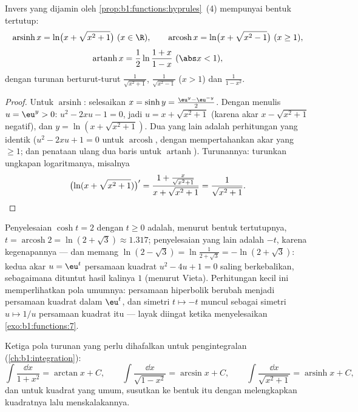 \begin{proposition}\label{prop:b1:functions:invhyp}
Invers yang dijamin oleh \cref{prop:b1:functions:hyprules}~(4) mempunyai
bentuk tertutup:
\[
\operatorname{arsinh} x = \ln\bigl(x + \sqrt{x^2 + 1}\bigr)
\ (x \in \R),
\qquad
\operatorname{arcosh} x = \ln\bigl(x + \sqrt{x^2 - 1}\bigr)
\ (x \geq 1),
\]
\[
\operatorname{artanh} x = \frac 12 \ln\frac{1 + x}{1 - x}
\ (\abs x < 1),
\]
dengan turunan berturut-turut $\frac{1}{\sqrt{x^2+1}}$, $\frac{1}{\sqrt{x^2-1}}$
($x > 1$) dan $\frac{1}{1 - x^2}$.
\end{proposition}

\begin{proof}
Untuk $\operatorname{arsinh}$: selesaikan $x = \sinh y = \frac{\eu^y -
\eu^{-y}}{2}$. Dengan menulis $u = \eu^y > 0$: $u^2 - 2xu - 1 = 0$, jadi $u = x
+ \sqrt{x^2 + 1}$ (karena akar $x - \sqrt{x^2+1}$ negatif), dan $y =
\ln(x + \sqrt{x^2+1})$. Dua yang lain adalah perhitungan yang identik
($u^2 - 2xu + 1 = 0$ untuk $\operatorname{arcosh}$, dengan mempertahankan akar
yang $\geq 1$; dan penataan ulang dua baris untuk $\operatorname{artanh}$).
Turunannya: turunkan ungkapan logaritmanya, misalnya
\[
\bigl(\ln(x + \sqrt{x^2+1})\bigr)'
= \frac{1 + \frac{x}{\sqrt{x^2+1}}}{x + \sqrt{x^2+1}}
= \frac{1}{\sqrt{x^2 + 1}} . \qedhere
\]
\end{proof}

\begin{example}\label{ex:b1:functions:arcoshtwo}
Penyelesaian $\cosh t = 2$ dengan $t \geq 0$ adalah, menurut bentuk
tertutupnya, $t = \operatorname{arcosh} 2 = \ln(2 + \sqrt3) \approx
1.317$; penyelesaian yang lain adalah $-t$, karena kegenapannya --- dan memang
$\ln(2 - \sqrt3) = \ln\frac1{2 + \sqrt3} = -\ln(2 + \sqrt3)$: kedua
akar $u = \eu^t$ persamaan kuadrat $u^2 - 4u + 1 = 0$ saling
berkebalikan, sebagaimana dituntut hasil kalinya $1$ (menurut Vieta). Perhitungan
kecil ini memperlihatkan pola umumnya: persamaan hiperbolik
berubah menjadi persamaan kuadrat dalam $\eu^t$, dan simetri $t \mapsto -t$
muncul sebagai simetri $u \mapsto 1/u$ persamaan kuadrat itu ---
layak diingat ketika menyelesaikan \cref{exo:b1:functions:7}.
\end{example}

\begin{method}\label{met:b1:functions:primitive}
Ketiga pola turunan yang perlu dihafalkan untuk pengintegralan
(\cref{ch:b1:integration}):
\[
\int \frac{\dd x}{1 + x^2} = \arctan x + C,
\qquad
\int \frac{\dd x}{\sqrt{1 - x^2}} = \arcsin x + C,
\qquad
\int \frac{\dd x}{\sqrt{x^2 + 1}} = \operatorname{arsinh} x + C,
\]
dan untuk kuadrat yang umum, susutkan ke bentuk itu dengan melengkapkan kuadratnya
lalu menskalakannya.
\end{method}

